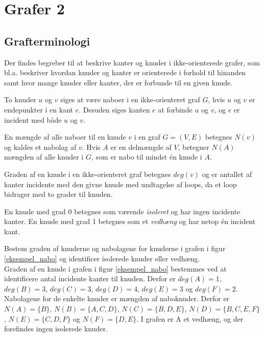 \section{Grafer 2}
\subsection{Grafterminologi}

Der findes begreber til at beskrive kanter og knuder i ikke-orienterede grafer, som bl.a. beskriver hvordan knuder og kanter er orienterede i forhold til hinanden samt hvor mange knuder eller kanter, der er forbunde til en given knude.

\begin{defn}
To knuder $u$ og $v$ siges at være naboer i en ikke-orienteret graf $G$, hvis $u$ og $v$ er endepunkter i en kant $e$. Desuden siges kanten $e$ at forbinde $u$ og $v$, og $e$ er incident med både $u$ og $v$.
\end{defn}

\begin{defn}
En mængde af alle naboer til en knude $v$ i en graf $G=(V,E)$ betegnes $N(v)$ og kaldes et nabolag af $v$. Hvis $A$ er en delmængde af $V$, betegner $N(A)$ mængden af alle knuder i $G$, som er nabo til mindst én knude i $A$.
\end{defn}

\begin{defn}
Graden af en knude i en ikke-orienteret graf betegnes $deg(v)$ og er antallet af kanter incidente med den givne knude med undtagelse af loops, da et loop bidrager med to grader til knuden. 
\end{defn}

En knude med grad 0 betegnes som værende \textit{isoleret} og har ingen incidente kanter. En knude med grad 1 betegnes som et \textit{vedhæng} og har netop én incident kant.

\begin{exmp}
Bestem graden af knuderne og nabolagene for knuderne i grafen i figur \ref{eksempel_nabo} og identificer isolerede knuder eller vedhæng.\\
Graden af en knude i grafen i figur \ref{eksempel_nabo} bestemmes ved at identificere antal incidente kanter til knuden. Derfor er $deg(A)=1$, $deg(B)=3$, $deg(C)=3$, $deg(D)=4$, $deg(E)=3$ og $deg(F)=2$. 
Nabolagene for de enkelte knuder er mængden af naboknuder. 
Derfor er $N(A)=\lbrace B \rbrace$, $N(B)=\lbrace A, C, D \rbrace$, $N(C)=\lbrace B, D, E \rbrace$, $N(D)=\lbrace B, C, E, F \rbrace$, $N(E)=\lbrace C, D, F \rbrace$ og $N(F)=\lbrace D, E \rbrace$. 
I grafen er A et vedhæng, og der forefindes ingen isolerede knuder.
\end{exmp}

